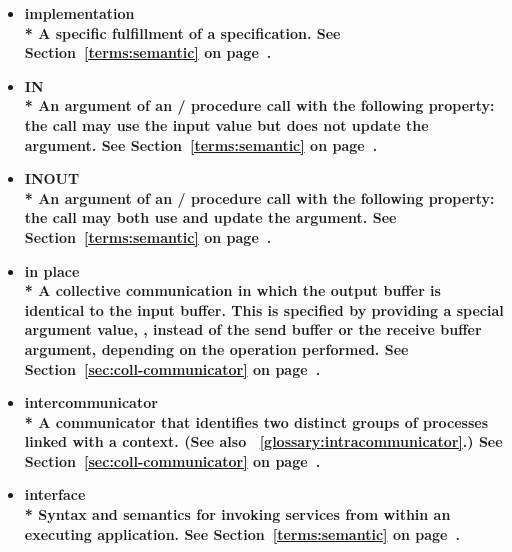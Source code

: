 \begin{itemize}
\label{glossary:implementation}
\item \bf{ implementation} \\*
A specific fulfillment of a specification.  
See Section~\ref{terms:semantic} on page~\pageref{terms:semantic}.

\label{glossary:IN}
\item \bf{ IN} \\*
An argument of an \MPI/ procedure call with the following property: the call may use the input value but does 
not update the argument.
See Section~\ref{terms:semantic} on page~\pageref{terms:semantic}.

\label{glossary:INOUT}
\item \bf{ INOUT} \\*
An argument of an \MPI/ procedure call with the following property: the call may both use and update the argument.
See Section~\ref{terms:semantic} on page~\pageref{terms:semantic}.

\label{glossary:in_place}
\item \bf{ in place} \\*
A collective communication in which the output
buffer is identical to the input buffer.  This is specified by
providing a special argument value, , instead of the
send buffer or the receive buffer argument,
depending on the operation performed. 
See Section~\ref{sec:coll-communicator} on page~\pageref{sec:coll-communicatorr}.

\label{glossary:intercommunicator}
\item \bf{ intercommunicator} \\*
A communicator that identifies two distinct groups of processes
linked with a context.  (See also ~\ref{glossary:intracommunicator}.)
See Section~\ref{sec:coll-communicator} on page~\pageref{sec:coll-communicator}.

\label{glossary:interface}
\item \bf{ interface} \\* 
Syntax and semantics for invoking services from within an executing application.  
See Section~\ref{terms:semantic} on page~\pageref{terms:semantic}.


\end{itemize}
